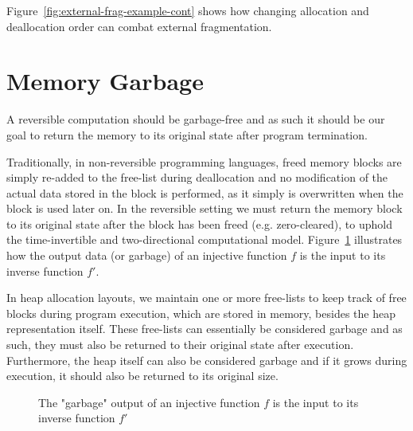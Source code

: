 Figure~\ref{fig:external-frag-example-cont} shows how changing allocation and deallocation order can combat external fragmentation.

\section{Memory Garbage}
\label{sec:memory-garbage}
A reversible computation should be garbage-free and as such it should be our goal to return the memory to its original state after program termination.

Traditionally, in non-reversible programming languages, freed memory blocks are simply re-added to the free-list during deallocation and no modification of the actual data stored in the block is performed, as it simply is overwritten when the block is used later on. In the reversible setting we must return the memory block to its original state after the block has been freed (e.g. zero-cleared), to uphold the time-invertible and two-directional computational model. Figure~\ref{fig:injective-garbage-in-out} illustrates how the output data (or garbage) of an injective function $f$ is the input to its inverse function $f'$.

In heap allocation layouts, we maintain one or more free-lists to keep track of free blocks during program execution, which are stored in memory, besides the heap representation itself. These free-lists can essentially be considered garbage and as such, they must also be returned to their original state after execution. Furthermore, the heap itself can also be considered garbage and if it grows during execution, it should also be returned to its original size.

\begin{figure}[ht]
  \centering
    \caption{The "garbage" output of an injective function $f$ is the input to its inverse function $f'$}
    \label{fig:injective-garbage-in-out}
\end{figure}

